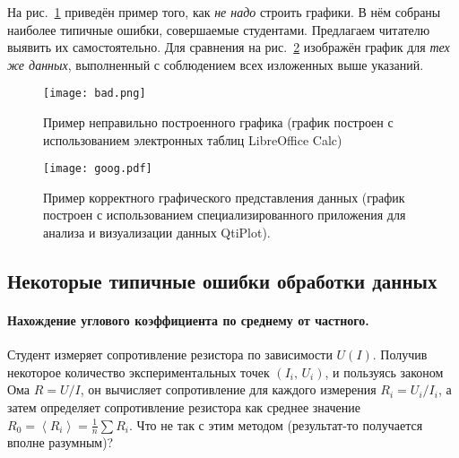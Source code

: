 \documentclass[10pt]{article}
\begin{document}
На рис.~\ref{fig:incorrect} приведён пример того, как \emph{не надо}
строить графики. В нём собраны наиболее типичные ошибки, совершаемые
студентами. Предлагаем читателю выявить их самостоятельно. Для сравнения
на рис.~\ref{fig:correct} изображён график для \emph{тех же данных},
выполненный с соблюдением всех изложенных выше указаний.
\begin{figure}[H]
\begin{centering}
\texttt{[image: bad.png]}
\par\end{centering}
\caption{\label{fig:incorrect}Пример неправильно построенного графика (график
построен с использованием электронных таблиц LibreOffice Calc)}
\end{figure}
\begin{figure}[H]
\begin{centering}
\texttt{[image: goog.pdf]}
\par\end{centering}
\caption{\label{fig:correct}Пример корректного графического представления
данных (график построен с использованием специализированного приложения
для анализа и визуализации данных QtiPlot).}
\end{figure}


\subsection{Некоторые типичные ошибки обработки данных}

\paragraph{Нахождение углового коэффициента по среднему от частного.}

Студент измеряет сопротивление резистора по зависимости $U\!\left(I\right)$.
Получив некоторое количество экспериментальных точек $\left(I_{i},\,U_{i}\right)$,
и пользуясь законом Ома $R=U/I$, он вычисляет сопротивление для каждого
измерения $R_{i}=U_{i}/I_{i}$, а затем определяет сопротивление резистора
как среднее значение $R_{0}=\left\langle R_{i}\right\rangle =\frac{1}{n}\sum R_{i}$.
Что не так с этим методом (результат-то получается вполне разумным)?
\end{document}
